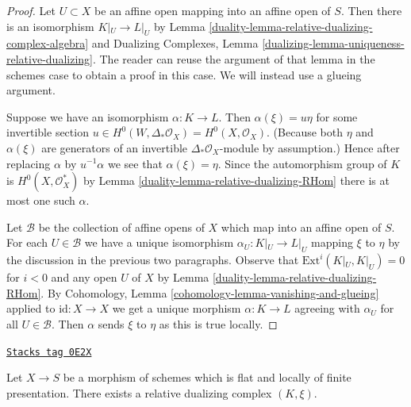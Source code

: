 \begin{proof}

Let $U \subset X$ be an affine open mapping into an
affine open of $S$. Then there is an isomorphism
$K|_U \to L|_U$ by Lemma \ref{duality-lemma-relative-dualizing-complex-algebra} and
Dualizing Complexes, Lemma
\ref{dualizing-lemma-uniqueness-relative-dualizing}.
The reader can reuse the argument of that lemma
in the schemes case to obtain a proof in this case.
We will instead use a glueing argument.

\medskip\noindent
Suppose we have an isomorphism $\alpha : K \to L$.
Then $\alpha(\xi) = u \eta$ for some invertible section
$u \in H^0(W, \Delta_*\mathcal{O}_X) = H^0(X, \mathcal{O}_X)$.
(Because both $\eta$ and $\alpha(\xi)$ are generators
of an invertible $\Delta_*\mathcal{O}_X$-module by assumption.)
Hence after replacing $\alpha$ by $u^{-1}\alpha$
we see that $\alpha(\xi) = \eta$.
Since the automorphism group of
$K$ is $H^0(X, \mathcal{O}_X^*)$ by Lemma \ref{duality-lemma-relative-dualizing-RHom}
there is at most one such $\alpha$.

\medskip\noindent
Let $\mathcal{B}$ be the collection of affine opens of
$X$ which map into an affine open of $S$. For each $U \in \mathcal{B}$
we have a unique isomorphism $\alpha_U : K|_U \to L|_U$
mapping $\xi$ to $\eta$ by the discussion in the previous
two paragraphs.
Observe that $\text{Ext}^i(K|_U, K|_U) = 0$ for $i < 0$
and any open $U$ of $X$ by Lemma \ref{duality-lemma-relative-dualizing-RHom}.
By Cohomology, Lemma \ref{cohomology-lemma-vanishing-and-glueing}
applied to $\text{id} : X \to X$ we get a unique morphism
$\alpha : K \to L$ agreeing
with $\alpha_U$ for all $U \in \mathcal{B}$.
Then $\alpha$ sends $\xi$ to $\eta$ as this is true locally.
\end{proof}

\begin{lemma}
\label{duality-lemma-existence-relative-dualizing}
\href{https://stacks.math.columbia.edu/tag/0E2X}{\texttt{Stacks tag 0E2X}}

Let $X \to S$ be a morphism of schemes which is
flat and locally of finite presentation.
There exists a relative dualizing complex $(K, \xi)$.
\end{lemma}


